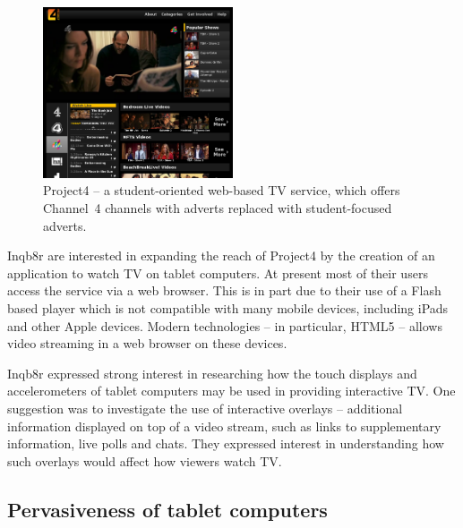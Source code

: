 	\begin{figure}[htb]
		\centering
			\includegraphics[width=0.5\textwidth]{images/project4.png}
		\caption{Project4 -- a student-oriented web-based TV service, which offers Channel~4 channels with adverts replaced with student-focused adverts.}
		\label{fig:project4}
	\end{figure}

	Inqb8r are interested in expanding the reach of Project4 by the creation of an application to watch TV on tablet computers. At present most of their users access the service via a web browser. This is in part due to their use of a Flash based player which is not compatible with many mobile devices, including iPads and other Apple devices. Modern technologies -- in particular, HTML5 -- allows video streaming in a web browser on these devices.

	Inqb8r expressed strong interest in researching how the touch displays and accelerometers of tablet computers may be used in providing interactive TV. One suggestion was to investigate the use of interactive overlays -- additional information displayed on top of a video stream, such as links to supplementary information, live polls and chats. They expressed interest in understanding how such overlays would affect how viewers watch TV.
	

\subsection{Pervasiveness of tablet computers}

